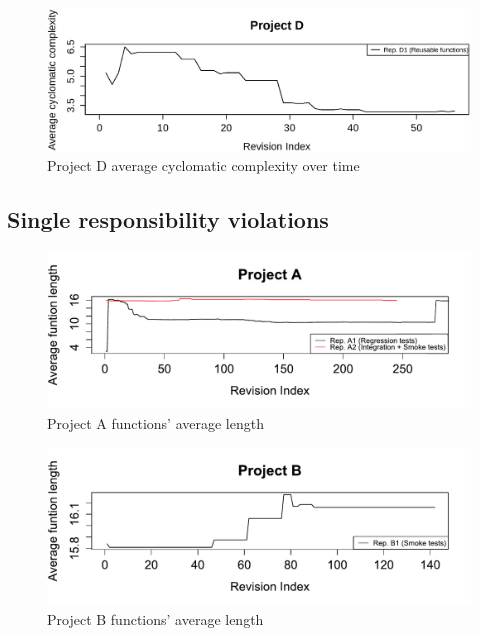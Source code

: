 \begin{figure}[!htbp]
    \centering
    \includegraphics[width=\textwidth,keepaspectratio]{figure/results/rq1/project_d_avg_complexity.eps}
    \caption{Project D average cyclomatic complexity over time}
    \label{fig:project_d_avg_complexity}
\end{figure}




\subsection{Single responsibility violations}

\begin{figure}[!htbp]
    \centering
    \includegraphics[width=\textwidth,keepaspectratio]{figure/results/rq1/avg_length_project_a.pdf}
    \caption{Project A functions' average length}
    \label{fig:avg_length_project_a}
\end{figure}

\begin{figure}[!htbp]
    \centering
    \includegraphics[width=\textwidth,keepaspectratio]{figure/results/rq1/avg_length_project_b.pdf}
    \caption{Project B  functions' average length}
    \label{fig:avg_length_project_b}
\end{figure}

